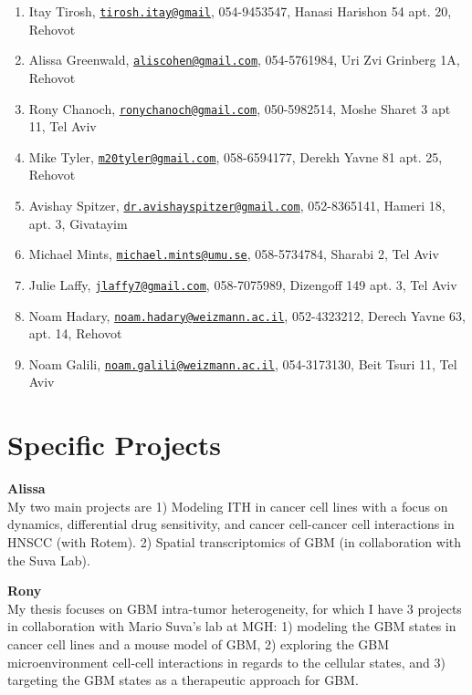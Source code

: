\documentclass[]{book}
\providecommand{\tightlist}{%
  \setlength{\itemsep}{0pt}\setlength{\parskip}{0pt}}
\begin{document}
\begin{enumerate}
\def\labelenumi{\arabic{enumi}.}
\tightlist
\item
  Itay Tirosh,
  \href{mailto:tirosh.itay@gmail}{\nolinkurl{tirosh.itay@gmail}},
  054-9453547, Hanasi Harishon 54 apt. 20, Rehovot
\item
  Alissa Greenwald,
  \href{mailto:aliscohen@gmail.com}{\nolinkurl{aliscohen@gmail.com}},
  054-5761984, Uri Zvi Grinberg 1A, Rehovot
\item
  Rony Chanoch,
  \href{mailto:ronychanoch@gmail.com}{\nolinkurl{ronychanoch@gmail.com}},
  050-5982514, Moshe Sharet 3 apt 11, Tel Aviv
\item
  Mike Tyler,
  \href{mailto:m20tyler@gmail.com}{\nolinkurl{m20tyler@gmail.com}},
  058-6594177, Derekh Yavne 81 apt. 25, Rehovot
\item
  Avishay Spitzer,
  \href{mailto:dr.avishayspitzer@gmail.com}{\nolinkurl{dr.avishayspitzer@gmail.com}},
  052-8365141, Hameri 18, apt. 3, Givatayim
\item
  Michael Mints,
  \href{mailto:michael.mints@umu.se}{\nolinkurl{michael.mints@umu.se}},
  058-5734784, Sharabi 2, Tel Aviv
\item
  Julie Laffy,
  \href{mailto:jlaffy7@gmail.com}{\nolinkurl{jlaffy7@gmail.com}},
  058-7075989, Dizengoff 149 apt. 3, Tel Aviv
\item
  Noam Hadary,
  \href{mailto:noam.hadary@weizmann.ac.il}{\nolinkurl{noam.hadary@weizmann.ac.il}},
  052-4323212, Derech Yavne 63, apt. 14, Rehovot
\item
  Noam Galili,
  \href{mailto:noam.galili@weizmann.ac.il}{\nolinkurl{noam.galili@weizmann.ac.il}},
  054-3173130, Beit Tsuri 11, Tel Aviv
\end{enumerate}

\chapter{Specific Projects}\label{projects}

\textbf{Alissa}\\
My two main projects are 1) Modeling ITH in cancer cell lines with a
focus on dynamics, differential drug sensitivity, and cancer cell-cancer
cell interactions in HNSCC (with Rotem). 2) Spatial transcriptomics of
GBM (in collaboration with the Suva Lab).

\textbf{Rony}\\
My thesis focuses on GBM intra-tumor heterogeneity, for which I have 3
projects in collaboration with Mario Suva's lab at MGH: 1) modeling the
GBM states in cancer cell lines and a mouse model of GBM, 2) exploring
the GBM microenvironment cell-cell interactions in regards to the
cellular states, and 3) targeting the GBM states as a therapeutic
approach for GBM.
\end{document}
